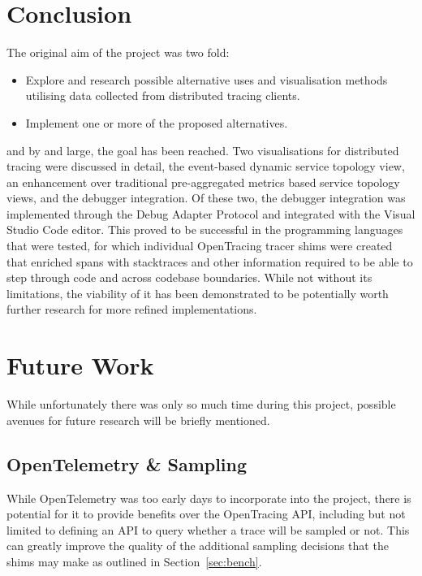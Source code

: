 \documentclass[12pt,pdftex,titlepage]{report}
\begin{document}
        \section{Conclusion}
        The original aim of the project was two fold:
        \begin{itemize}
            \item Explore and research possible alternative uses and visualisation methods utilising data collected from distributed tracing clients.
            \item Implement one or more of the proposed alternatives.
        \end{itemize}
        and by and large, the goal has been reached. Two visualisations for distributed tracing were discussed in detail, the event-based dynamic service topology view, an enhancement over traditional pre-aggregated metrics
        based service topology views, and the debugger integration. Of these two, the debugger integration was implemented through the Debug Adapter Protocol and integrated with the Visual Studio Code editor. This proved to 
        be successful in the programming languages that were tested, for which individual OpenTracing tracer shims were created that enriched spans with stacktraces and other information required to be able to step through
        code and across codebase boundaries. While not without its limitations, the viability of it has been demonstrated to be potentially worth further research for more refined implementations.
        
        \section{Future Work}
        \label{sec:future}
            While unfortunately there was only so much time during this project, possible avenues for future research will be briefly mentioned.

            \subsection{OpenTelemetry \& Sampling}
                While OpenTelemetry was too early days to incorporate into the project, there is potential for it to provide benefits over the OpenTracing API, including but not limited to
                defining an API to query whether a trace will be sampled or not. This can greatly improve the quality of the additional sampling decisions that the shims may make as outlined 
                in Section~\ref{sec:bench}.
\end{document}
